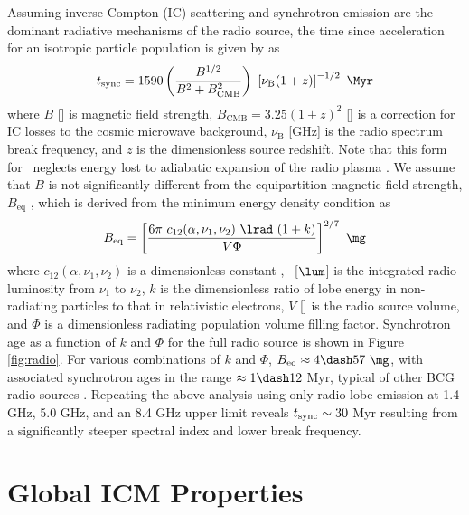\documentclass[useAMS,usenatbib]{mn2e}
\begin{document}
Assuming inverse-Compton (IC) scattering and synchrotron emission are
the dominant radiative mechanisms of the radio source, the time since
acceleration for an isotropic particle population is given by
\citet{2001AJ....122.1172S} as
\begin{equation}
  \tsync = 1590 \left(\frac{B^{1/2}}{B^2 + B_{\mathrm{CMB}}^2}\right)~
  \left[\nu_{\mathrm{B}} (1+z)\right]^{-1/2} ~\Myr
\end{equation}
where $B$ [\mg] is magnetic field strength, $B_{\mathrm{CMB}} =
3.25(1+z)^2$ [\mg] is a correction for IC losses to the cosmic
microwave background, $\nu_{\mathrm{B}}$ [GHz] is the radio spectrum
break frequency, and $z$ is the dimensionless source redshift. Note
that this form for \tsync\ neglects energy lost to adiabatic expansion
of the radio plasma \citep{1968ARA&A...6..321S}. We assume that $B$ is
not significantly different from the equipartition magnetic field
strength, $B_{\mathrm{eq}}$ \citep[see][for thorough discussion of the
  validity and shortcomings of this assumption]{birzan08}, which is
derived from the minimum energy density condition as
\citep{1980ARA&A..18..165M}
\begin{equation}
  B_{\mathrm{eq}} = \left[\frac{6 \pi ~c_{12}(\alpha,\nu_1, \nu_2)
      ~\lrad ~(1+k)}{V \Phi}\right]^{2/7} ~\mathrm{\mg}
\end{equation}
where $c_{12}(\alpha,\nu_1,\nu_2)$ is a dimensionless constant
\citep{pach}, \lrad\ [$\lum$] is the integrated radio luminosity from
$\nu_1$ to $\nu_2$, $k$ is the dimensionless ratio of lobe energy in
non-radiating particles to that in relativistic electrons, $V$ [\cc]
is the radio source volume, and $\Phi$ is a dimensionless radiating
population volume filling factor. Synchrotron age as a function of $k$
and $\Phi$ for the full radio source is shown in Figure
\ref{fig:radio}. For various combinations of $k$ and $\Phi$,
$B_{\mathrm{eq}} \approx 4 \dash 57 ~\mg$, with associated synchrotron
ages in the range $\approx 1 \dash 12$ Myr, typical of other BCG radio
sources \citep[\eg][]{birzan08}. Repeating the above analysis using
only radio lobe emission at 1.4 GHz, 5.0 GHz, and an 8.4 GHz upper
limit reveals $t_{\mathrm{sync}} \sim 30$ Myr resulting from a significantly
steeper spectral index and lower break frequency.

\section{Global ICM Properties}
\label{sec:global}
\end{document}

